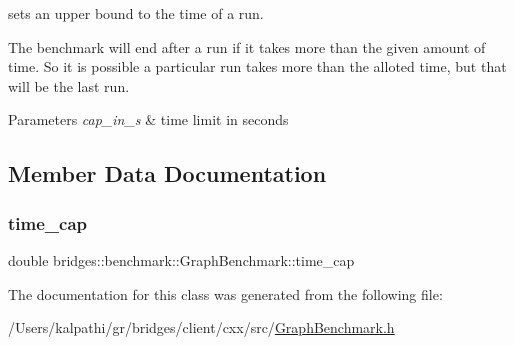 sets an upper bound to the time of a run. 

The benchmark will end after a run if it takes more than the given amount of time. So it is possible a particular run takes more than the alloted time, but that will be the last run.


\begin{DoxyParams}{Parameters}
{\em cap\+\_\+in\+\_\+s} & time limit in seconds \\
\hline
\end{DoxyParams}


\subsection{Member Data Documentation}
\mbox{\label{classbridges_1_1benchmark_1_1_graph_benchmark_a59938016b721fb6db2ff8bdb2c9d41c1}} 
\subsubsection{\texorpdfstring{time\+\_\+cap}{time\_cap}}
{\footnotesize\ttfamily double bridges\+::benchmark\+::\+Graph\+Benchmark\+::time\+\_\+cap\hspace{0.3cm}{\ttfamily [protected]}}



The documentation for this class was generated from the following file\+:\begin{DoxyCompactItemize}
\item 
/\+Users/kalpathi/gr/bridges/client/cxx/src/\mbox{\hyperlink{_graph_benchmark_8h}{Graph\+Benchmark.\+h}}\end{DoxyCompactItemize}
